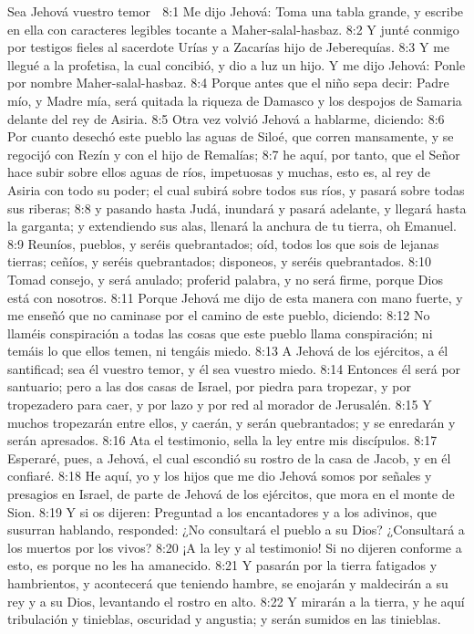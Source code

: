 Sea Jehová vuestro temor  

8:1 Me dijo Jehová: Toma una tabla grande, y escribe en ella con caracteres legibles tocante a Maher-salal-hasbaz.  
8:2 Y junté conmigo por testigos fieles al sacerdote Urías y a Zacarías hijo de Jeberequías.  
8:3 Y me llegué a la profetisa, la cual concibió, y dio a luz un hijo. Y me dijo Jehová: Ponle por nombre Maher-salal-hasbaz.  
8:4 Porque antes que el niño sepa decir: Padre mío, y Madre mía, será quitada la riqueza de Damasco y los despojos de Samaria delante del rey de Asiria.  
8:5 Otra vez volvió Jehová a hablarme, diciendo:  
8:6 Por cuanto desechó este pueblo las aguas de Siloé, que corren mansamente, y se regocijó con Rezín y con el hijo de Remalías;  
8:7 he aquí, por tanto, que el Señor hace subir sobre ellos aguas de ríos, impetuosas y muchas, esto es, al rey de Asiria con todo su poder; el cual subirá sobre todos sus ríos, y pasará sobre todas sus riberas;  
8:8 y pasando hasta Judá, inundará y pasará adelante, y llegará hasta la garganta; y extendiendo sus alas, llenará la anchura de tu tierra, oh Emanuel.  
8:9 Reuníos, pueblos, y seréis quebrantados; oíd, todos los que sois de lejanas tierras; ceñíos, y seréis quebrantados; disponeos, y seréis quebrantados.  
8:10 Tomad consejo, y será anulado; proferid palabra, y no será firme, porque Dios está con nosotros.  
8:11 Porque Jehová me dijo de esta manera con mano fuerte, y me enseñó que no caminase por el camino de este pueblo, diciendo:  
8:12 No llaméis conspiración a todas las cosas que este pueblo llama conspiración; ni temáis lo que ellos temen, ni tengáis miedo.  
8:13 A Jehová de los ejércitos, a él santificad; sea él vuestro temor, y él sea vuestro miedo.  
8:14 Entonces él será por santuario; pero a las dos casas de Israel, por piedra para tropezar, y por tropezadero para caer, y por lazo y por red al morador de Jerusalén.  
8:15 Y muchos tropezarán entre ellos, y caerán, y serán quebrantados; y se enredarán y serán apresados.  
8:16 Ata el testimonio, sella la ley entre mis discípulos.  
8:17 Esperaré, pues, a Jehová, el cual escondió su rostro de la casa de Jacob, y en él confiaré. 
8:18 He aquí, yo y los hijos que me dio Jehová somos por señales y presagios en Israel, de parte de Jehová de los ejércitos, que mora en el monte de Sion.  
8:19 Y si os dijeren: Preguntad a los encantadores y a los adivinos, que susurran hablando, responded: ¿No consultará el pueblo a su Dios? ¿Consultará a los muertos por los vivos?  
8:20 ¡A la ley y al testimonio! Si no dijeren conforme a esto, es porque no les ha amanecido.  
8:21 Y pasarán por la tierra fatigados y hambrientos, y acontecerá que teniendo hambre, se enojarán y maldecirán a su rey y a su Dios, levantando el rostro en alto.  
8:22 Y mirarán a la tierra, y he aquí tribulación y tinieblas, oscuridad y angustia; y serán sumidos en las tinieblas.  

